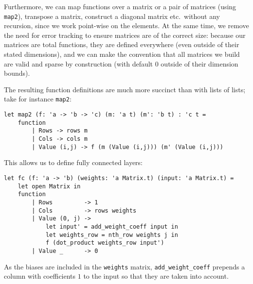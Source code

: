 \documentclass[runningheads]{llncs}
\newcommand{\knote}[1]{\todo[inline, color=blue!20]{#1}}
\begin{document}
Furthermore, we can map functions over a matrix or a pair of matrices  (using \lstinline{map2}), transpose a
matrix, construct a diagonal matrix etc.\ without any recursion, since we work
point-wise on the elements. At the same time, we remove the need for error
tracking to ensure matrices are of the correct size: because our matrices are
total functions, they are defined everywhere (even outside of their stated
dimensions), and we can make the convention that all matrices we build are valid
and sparse by construction (with default 0 outside of their dimension bounds).

The resulting function definitions are much more succinct than with lists of lists; take for instance \lstinline{map2}:

\begin{lstlisting}[language=caml]
let map2 (f: 'a -> 'b -> 'c) (m: 'a t) (m': 'b t) : 'c t =
	function
		| Rows -> rows m
		| Cols -> cols m
		| Value (i,j) -> f (m (Value (i,j))) (m' (Value (i,j)))
\end{lstlisting}

\noindent This allows us to define fully connected layers:

\begin{lstlisting}[language=caml]
let fc (f: 'a -> 'b) (weights: 'a Matrix.t) (input: 'a Matrix.t) = 
	let open Matrix in
	function
		| Rows         -> 1
		| Cols         -> rows weights
		| Value (0, j) -> 
			let input' = add_weight_coeff input in
			let weights_row = nth_row weights j in
			f (dot_product weights_row input')
		| Value _      -> 0
\end{lstlisting}

\noindent As the biases are included in the \lstinline|weights| matrix, \lstinline|add_weight_coeff| prepends a column with coefficients $1$ to the input so that they are taken into account.

\iffalse
-----------------------

\noindent The only help Imandra needs to prove this automatically -- are the forward-chaining rules about the $relu$ function:


\begin{lstlisting}[language=caml]
	lemma relu_pos x =
	x >= 0 ==> (relu x) [@trigger] = x
	[@@auto] [@@fc]
	
	lemma relu_neg x =
	x <= 0 ==> (relu x) [@trigger] = 0
	[@@auto] [@@fc]
\end{lstlisting}

\noindent And then we disable $relu$ for all of the proofs. This way,
$relu$ induces no simplification case-splits, while all
relevant information about $relu$ values is propagated,
per instance, on demand to our simplification context.
Now Imandra's engine takes care of the proof automatically  (when we use the tactic \lstinline{[@@auto]}), and takes just under 1.5 minutes.
\knote{explain better how auto works}
----------------------
\fi
\end{document}
